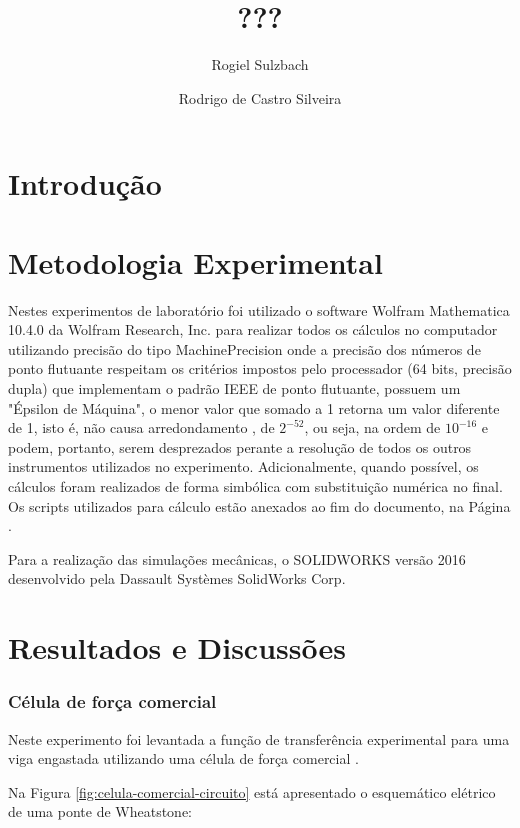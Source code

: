 \documentclass[a4paper]{instrumentacao}
\title{???}
\author{Rogiel Sulzbach \and Rodrigo de Castro Silveira}
\institute{}
\begin{document}
\maketitle

\chapter{Introdução}


\chapter{Metodologia Experimental}
Nestes experimentos de laboratório foi utilizado o software Wolfram Mathematica 10.4.0 da Wolfram Research, Inc. para realizar todos os cálculos no computador utilizando precisão do tipo MachinePrecision\cite{mathematica-numerial-precision} onde a precisão dos números de ponto flutuante respeitam os critérios impostos pelo processador (64 bits, precisão dupla) que implementam o padrão IEEE de ponto flutuante, possuem um "Épsilon de Máquina", o menor valor que somado a 1 retorna um valor diferente de 1, isto é, não causa arredondamento \cite{wikipedia-epsilon}, de $2^{-52}$, ou seja, na ordem de $10^{-16}$ e podem, portanto, serem desprezados perante a resolução de todos os outros instrumentos utilizados no experimento. Adicionalmente, quando possível, os cálculos foram realizados de forma simbólica com substituição numérica no final. Os scripts utilizados para cálculo estão anexados ao fim do documento, na Página \pageref{ch:attachments}.

Para a realização das simulações mecânicas, o SOLIDWORKS versão 2016 desenvolvido pela Dassault Systèmes SolidWorks Corp.

\chapter{Resultados e Discussões}

\subsection{Célula de força comercial}

Neste experimento foi levantada a função de transferência experimental para uma viga engastada utilizando uma célula de força comercial .

Na Figura \ref{fig:celula-comercial-circuito} está apresentado o esquemático elétrico de uma ponte de Wheatstone:
\end{document}
